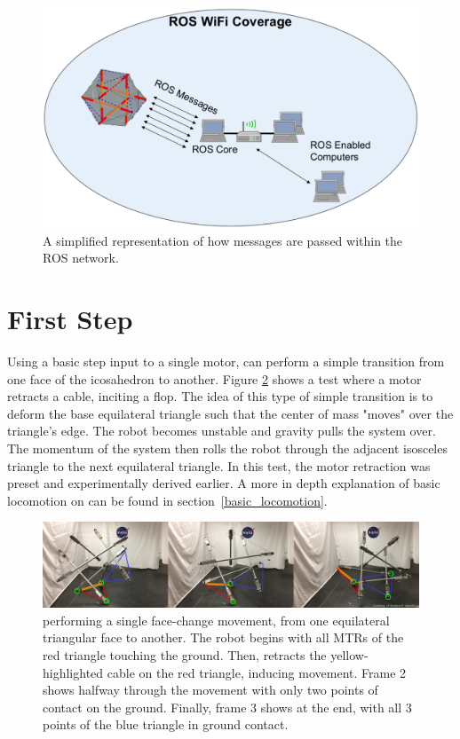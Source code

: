 \begin{figure}[thpb]%
      \centering
      \includegraphics[width=0.8\columnwidth]{tex/img/ROS_Wireless}
      \caption{A simplified representation of how messages are passed within the \SB{} ROS network.}
      \label{fig:ros_diagram}
\end{figure}

\section{First Step}
\label{first_step}
Using a basic step input to a single motor, \SB{} can perform a simple transition from one face of the icosahedron to another.
Figure \ref{fig:superball_flop_flat} shows a test where a motor retracts a cable, inciting a flop.
The idea of this type of simple transition is to deform the base equilateral triangle such that the center of mass "moves" over the triangle's edge.
The robot becomes unstable and gravity pulls the system over.
The momentum of the system then rolls the robot through the adjacent isosceles triangle to the next equilateral triangle.
In this test, the motor retraction was preset and experimentally derived earlier.
A more in depth explanation of basic locomotion on \SB{} can be found in section~\ref{basic_locomotion}.

\begin{figure}[t]
    \centering
    \includegraphics[width=1\linewidth]{tex/img/superball_flop_combined_betterlabels}
    \caption{\SB{} performing a single face-change movement, from one equilateral triangular face to another. The robot begins with all MTRs of the red triangle touching the ground. Then, \SB{} retracts the yellow-highlighted cable on the red triangle, inducing movement. Frame 2 shows \SB{} halfway through the movement with only two points of contact on the ground. Finally, frame 3 shows \SB{} at the end, with all 3 points of the blue triangle in ground contact.}
    \label{fig:superball_flop_flat}
\end{figure}
